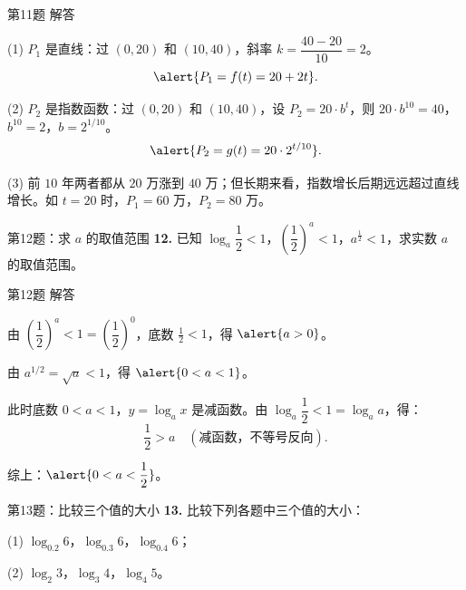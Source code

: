 \documentclass[10pt,aspectratio=169,serif]{beamer}
\begin{document}
\begin{frame}[t]{第11题 解答}
\begin{tcolorbox}[colback=orange!10,colframe=orange,title=\textbf{解}]
(1) $P_1$ 是直线：过 $(0, 20)$ 和 $(10, 40)$，斜率 $k=\dfrac{40-20}{10}=2$。
\[
\alert{P_1 = f(t) = 20 + 2t}.
\]

(2) $P_2$ 是指数函数：过 $(0, 20)$ 和 $(10, 40)$，设 $P_2=20\cdot b^t$，则 $20\cdot b^{10}=40$，$b^{10}=2$，$b=2^{1/10}$。
\[
\alert{P_2 = g(t) = 20\cdot 2^{t/10}}.
\]

(3) 前 $10$ 年两者都从 $20$ 万涨到 $40$ 万；但长期来看，指数增长后期远远超过直线增长。如 $t=20$ 时，$P_1=60$ 万，$P_2=80$ 万。
\end{tcolorbox}
\end{frame}

\begin{frame}[t]{第12题：求 $a$ 的取值范围}
\textbf{12.} 已知 $\log_a\dfrac{1}{2} < 1$，$\left(\dfrac{1}{2}\right)^a < 1$，$a^{\frac{1}{2}} < 1$，求实数 $a$ 的取值范围。
\end{frame}

\begin{frame}[t]{第12题 解答}
\begin{tcolorbox}[colback=orange!10,colframe=orange,title=\textbf{解}]
由 $\left(\dfrac{1}{2}\right)^a < 1 = \left(\dfrac{1}{2}\right)^0$，底数 $\frac{1}{2}<1$，得 $\alert{a > 0}$。

由 $a^{1/2} = \sqrt{a} < 1$，得 $\alert{0 < a < 1}$。

此时底数 $0<a<1$，$y=\log_a x$ 是减函数。由 $\log_a\dfrac{1}{2} < 1 = \log_a a$，得：
\[
\frac{1}{2} > a \quad(\text{减函数，不等号反向}).
\]

\vspace{0.3em}
综上：$\alert{0 < a < \dfrac{1}{2}}$。
\end{tcolorbox}
\end{frame}

\begin{frame}[t]{第13题：比较三个值的大小}
\textbf{13.} 比较下列各题中三个值的大小：

\vspace{0.8em}
(1) $\log_{0.2} 6$，$\log_{0.3} 6$，$\log_{0.4} 6$；

\vspace{0.8em}
(2) $\log_2 3$，$\log_3 4$，$\log_4 5$。
\end{frame}
\end{document}
